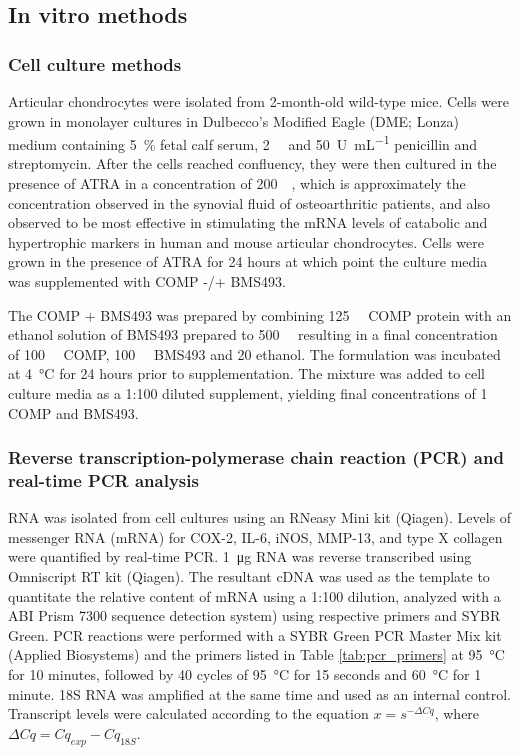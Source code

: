 \begin{refsection}
\subsection{In vitro methods}

\subsubsection{Cell culture methods}
\label{sec:culture_methods}
Articular chondrocytes were isolated from 2-month-old wild-type mice.  Cells
were grown in monolayer cultures in Dulbecco's Modified Eagle (DME; Lonza)
medium containing \SI{5}{\percent} fetal calf serum, \SI{2}{\milli\moLar}
 and \SI{50}{U\per\mL} penicillin and streptomycin. After
the cells reached confluency, they were then cultured in the presence of ATRA in
a concentration of \SI{200}{\nano\moLar}, which is approximately the
concentration observed in the synovial fluid of osteoarthritic
patients,\cite{Davies2009} and also observed to be most effective in stimulating
the mRNA levels of catabolic and hypertrophic markers in human and mouse
articular chondrocytes.\cite{Campbell2013b} Cells were grown in the presence of
ATRA for 24 hours at which point the culture media was supplemented with
COMP -/+ BMS493.

The COMP + BMS493 was prepared by combining \SI{125}{\micro\moLar} COMP protein
with an ethanol solution of BMS493 prepared to \SI{500}{\micro\moLar} resulting
in a final concentration of \SI{100}{\micro\moLar} COMP, \SI{100}{\micro\moLar}
BMS493 and \SI{20}{\volper} ethanol. The formulation was incubated at
\SI{4}{\celsius} for 24 hours prior to supplementation. The mixture was added to
cell culture media as a 1:100 diluted supplement, yielding final concentrations
of \SI{1}{\micro\moLar} COMP and BMS493.

\subsubsection{Reverse transcription-polymerase chain reaction (PCR) and
real-time PCR analysis} RNA was isolated from cell cultures using an RNeasy Mini
kit (Qiagen). Levels of messenger RNA (mRNA) for COX-2, IL-6, iNOS, MMP-13, and
type X collagen were quantified by real-time PCR. \SI{1}{\micro\gram} RNA was
reverse transcribed using Omniscript RT kit (Qiagen). The resultant cDNA was
used as the template to quantitate the relative content of mRNA using a 1:100
dilution, analyzed with a ABI Prism 7300 sequence detection system) using
respective primers and SYBR Green.  PCR reactions were performed with a SYBR
Green PCR Master Mix kit (Applied Biosystems) and the primers listed in Table
\ref{tab:pcr_primers} at \SI{95}{\celsius} for 10 minutes, followed by 40 cycles
of \SI{95}{\celsius} for 15 seconds and \SI{60}{\celsius} for 1 minute. 18S RNA
was amplified at the same time and used as an internal control. Transcript
levels were calculated according to the equation ${x=s^{- \Delta C q}}$, where
${\Delta C q = C q_{exp} - C q _{18S}}$.


\end{refsection}
